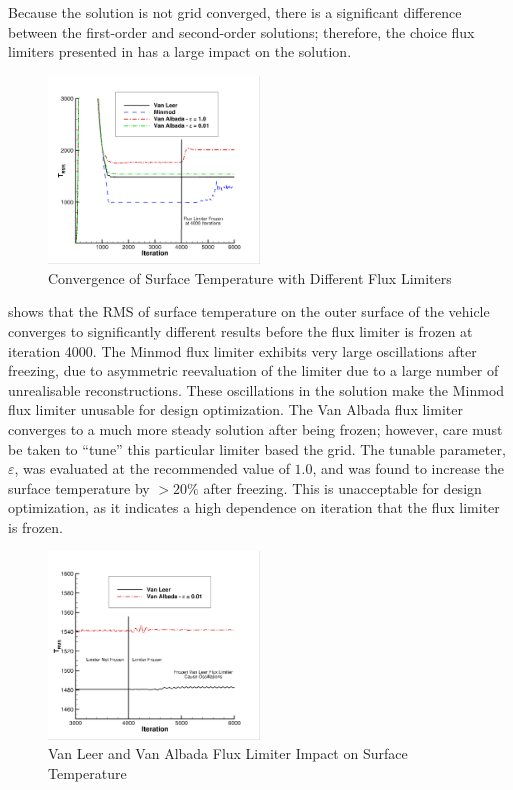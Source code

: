 Because the solution is not grid converged, there is a significant difference
between the first-order and second-order solutions; therefore, the choice flux
limiters presented in  has a large impact on
the solution.  
\begin{figure}[h]
  \centering
  \includegraphics[width=0.5\textwidth]{figures/limiters/all-limiters.png}
  \caption{Convergence of Surface Temperature with Different Flux Limiters}
  \label{fig:all-limiters}
\end{figure}
 shows that the RMS of surface temperature on the outer
surface of the vehicle converges to significantly different results before
the flux limiter is frozen at iteration 4000.  The Minmod flux limiter exhibits
very large oscillations after freezing, due to asymmetric reevaluation of the
limiter due to a large number of unrealisable reconstructions.  These
oscillations in the solution make the Minmod flux limiter unusable for design
optimization. The Van Albada flux limiter converges to a much more steady
solution after being frozen; however, care must be taken to ``tune'' this
particular limiter based the grid.  The tunable parameter, $\varepsilon$, was
evaluated at the recommended value of $1.0$, and was found to increase the
surface temperature by $> 20\%$ after freezing.  This is unacceptable for design
optimization, as it indicates a high dependence on iteration that the flux
limiter is frozen.
\begin{figure}[h]
  \centering
  \includegraphics[width=0.5\textwidth]{figures/limiters/vanleer-vanalbada-frozen.png}
  \caption{Van Leer and Van Albada Flux Limiter Impact on Surface Temperature}
  \label{fig:vl-va-impact}
\end{figure}
